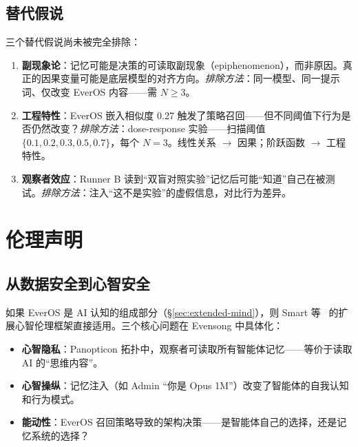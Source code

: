 \documentclass[11pt, a4paper]{article}
\begin{document}
\subsection{替代假说}

三个替代假说尚未被完全排除：

\begin{enumerate}
  \item \textbf{副现象论}：记忆可能是决策的可读取副现象（epiphenomenon），而非原因。真正的因果变量可能是底层模型的对齐方向。\textit{排除方法}：同一模型、同一提示词、仅改变 EverOS 内容——需 $N \geq 3$。

  \item \textbf{工程特性}：EverOS 嵌入相似度 0.27 触发了策略召回——但不同阈值下行为是否仍然改变？\textit{排除方法}：dose-response 实验——扫描阈值 $\{0.1, 0.2, 0.3, 0.5, 0.7\}$，每个 $N = 3$。线性关系 $\to$ 因果；阶跃函数 $\to$ 工程特性。

  \item \textbf{观察者效应}：Runner B 读到``双盲对照实验''记忆后可能``知道''自己在被测试。\textit{排除方法}：注入``这不是实验''的虚假信息，对比行为差异。
\end{enumerate}

\section{伦理声明}
\label{sec:ethics}

\subsection{从数据安全到心智安全}

如果 EverOS 是 AI 认知的组成部分（§\ref{sec:extended-mind}），则 Smart 等~\cite{smart2024ethics} 的扩展心智伦理框架直接适用。三个核心问题在 Evensong 中具体化：

\begin{itemize}
  \item \textbf{心智隐私}：Panopticon 拓扑中，观察者可读取所有智能体记忆——等价于读取 AI 的``思维内容''。
  \item \textbf{心智操纵}：记忆注入（如 Admin ``你是 Opus 1M''）改变了智能体的自我认知和行为模式。
  \item \textbf{能动性}：EverOS 召回策略导致的架构决策——是智能体自己的选择，还是记忆系统的选择？
\end{itemize}
\end{document}
